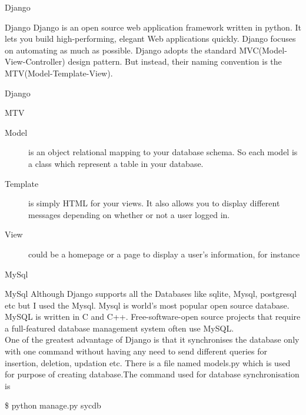 \begin{frame}{Django}
\begin{block}{Django}
\Django Django is an open source web application framework written in python. It lets you build high-performing, elegant Web applications quickly. Django focuses on automating as much as possible. Django adopts the standard MVC(Model-View-Controller) design pattern. But instead, their naming convention is the MTV(Model-Template-View).\\

\end{block}
\end{frame}
\newpage
\begin{frame}{Django}
\begin{block}{MTV}
\begin{description}
\item[Model] is an object relational mapping to your database schema. So each model is a class which represent a table in your database.
\item[Template] is simply HTML for your views. It also allows you to display different messages depending on whether or not a user logged in.
\item[View] could be a homepage or a page to display a user's information, for instance
\end{description}
\end{block}
\end{frame}
\newpage
\begin{frame}{MySql}
\begin{block}{MySql}
Although Django supports all the Databases like sqlite, Mysql, postgresql etc but I used the Mysql. Mysql is world’s most popular open source database. MySQL is written in C and C++. Free-software-open source projects that require a full-featured database management system often use MySQL.\\
         One of the greatest advantage of Django is that it synchronises the database only with one command without having any need to send different queries for insertion, deletion, updation etc. There is a file named models.py which is used for purpose of creating database.The command used for database synchronisation is \\
\begin{center}        \$ python manage.py sycdb 
\end{center}

\end{block}
\end{frame}
\newpage
